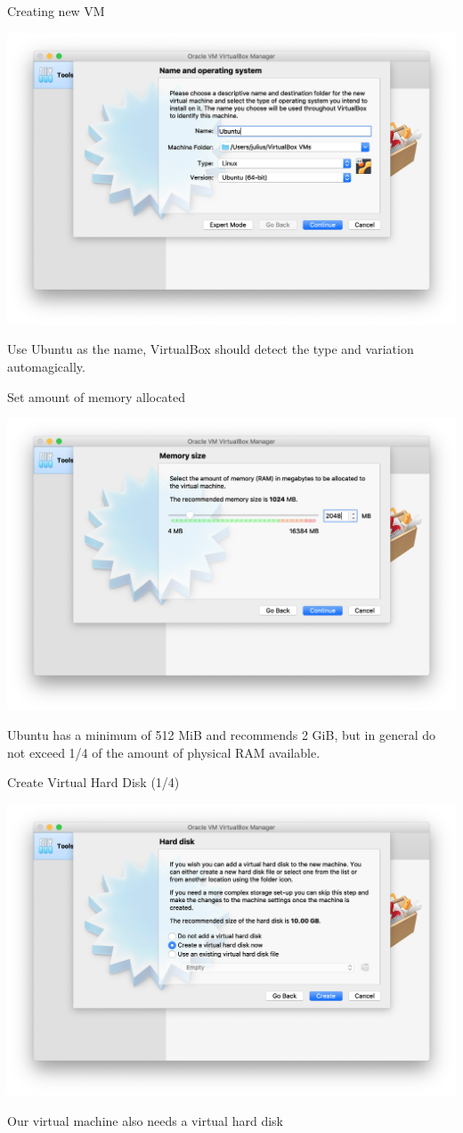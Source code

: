 \documentclass[12pt]{beamer}
\begin{document}
\begin{frame}{Creating new VM}
  \begin{center}
    \includegraphics[width=0.8\linewidth]{vb-new}
  \end{center}
  Use Ubuntu as the name, VirtualBox should detect the type and variation automagically.
\end{frame}

\begin{frame}{Set amount of memory allocated}
  \begin{center}
    \includegraphics[width=0.8\linewidth]{vb-mem}
  \end{center}
  Ubuntu has a minimum of 512 MiB and recommends 2 GiB, but in general do not exceed 1/4 of the amount of physical RAM available.
\end{frame}

\begin{frame}{Create Virtual Hard Disk (1/4)}
  \begin{center}
    \includegraphics[width=0.8\linewidth]{vb-hd}
  \end{center}
  Our virtual machine also needs a virtual hard disk
\end{frame}
\end{document}
